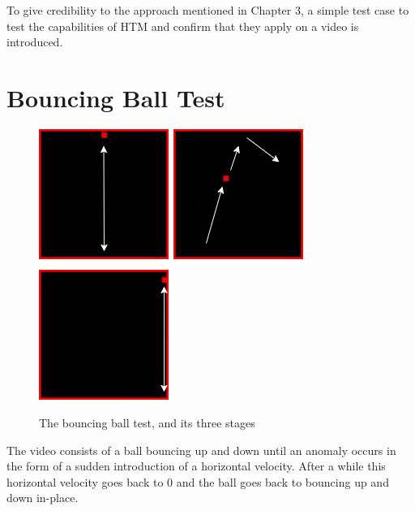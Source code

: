 To give credibility to the approach mentioned in Chapter 3, a simple test case to test the capabilities of HTM and confirm that they apply on a video is introduced.
\section{Bouncing Ball Test}

\begin{figure}[H]
    \centering
    \includegraphics[width=.3\textwidth]{resources/experiments/bouncing_ball/bb_updown1.png}\hfill
    \includegraphics[width=.3\textwidth]{resources/experiments/bouncing_ball/bb_updownside.png}\hfill
    \includegraphics[width=.3\textwidth]{resources/experiments/bouncing_ball/bb_updown2.png}
    \caption{The bouncing ball test, and its three stages}
    \label{fig:bb}
\end{figure}
The video consists of a ball bouncing up and down until an anomaly occurs in the form of a sudden introduction of a horizontal velocity. After a while this horizontal velocity goes back to 0 and the ball goes back to bouncing up and down in-place.
